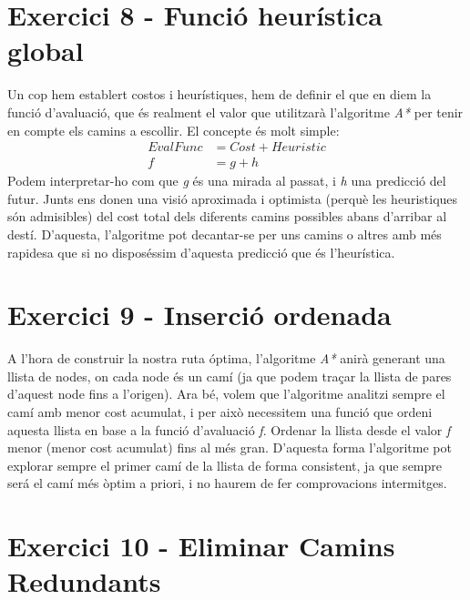 \documentclass[a4paper,12pt,hidelinks]{article}
\begin{document}
        \section{Exercici 8 - Funció heurística global}
        \label{sec:Exercici8}

            Un cop hem establert costos i heurístiques, hem de definir el que en diem la funció d'avaluació, que és realment el valor que utilitzarà l’algoritme \textit{A*} per tenir en compte els camins a escollir. El concepte és molt simple:
            \begin{align*}\label{eq:eval}
                EvalFunc &= Cost + Heuristic \\
                f &= g + h
            \end{align*}
            Podem interpretar-ho com que \textit{g} és una mirada al passat, i \textit{h} una predicció del futur. Junts ens donen una visió aproximada i optimista (perquè les heuristiques són admisibles) del cost total dels diferents camins possibles abans d’arribar al destí. D’aquesta, l’algoritme pot decantar-se per uns camins o altres amb més rapidesa que si no disposéssim d’aquesta predicció que és l’heurística.

        \section{Exercici 9 - Inserció ordenada}
        \label{sec:Exercici9}

            A l’hora de construir la nostra ruta óptima, l’algoritme \textit{A*} anirà generant una llista de nodes, on cada node és un camí (ja que podem traçar la llista de pares d’aquest node fins a l’origen). Ara bé, volem que l’algoritme analitzi sempre el camí amb menor cost acumulat, i per això necessitem una funció que ordeni aquesta llista en base a la funció d’avaluació \textit{f}.
            Ordenar la llista desde el valor \textit{f} menor (menor cost acumulat) fins al més gran.
            D’aquesta forma l’algoritme pot explorar sempre el primer camí de la llista de forma consistent, ja que sempre será el camí més òptim a priori, i no haurem de fer comprovacions intermitges.
        

        \section{Exercici 10 - Eliminar Camins Redundants}
        \label{sec:Exercici10}
        
\end{document}
